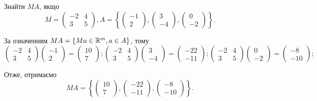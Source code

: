 \begin{problem}
	Знайти $MA$, якщо
	\[
	M=
  \begin{pmatrix}
    -2 & 4 \\
    3 & 5
  \end{pmatrix}
  , A= 
  \left\{
  \begin{pmatrix}
    -1 \\
    2 
  \end{pmatrix},
    \begin{pmatrix}
    3 \\
    -4 
  \end{pmatrix},
    \begin{pmatrix}
    0 \\
    -2 
  \end{pmatrix}
  \right\}
  .\]
\end{problem}

\begin{solution}
	За означенням $MA = \{Ma\in \mathbb{R}^m, a\in A\}$, тому
	\newline
   \[ \begin{pmatrix}
   -2 & 4 \\
   3 & 5
  \end{pmatrix}
  \begin{pmatrix}
    -1 \\
    2 
  \end{pmatrix}=
  \begin{pmatrix}
    10 \\
    7 
  \end{pmatrix};
   \begin{pmatrix}
   -2 & 4 \\
   3 & 5
  \end{pmatrix}
  \begin{pmatrix}
    3 \\
    -4 
  \end{pmatrix}=
  \begin{pmatrix}
    -22 \\
    -11 
  \end{pmatrix};
   \begin{pmatrix}
   -2 & 4 \\
   3 & 5
  \end{pmatrix}
  \begin{pmatrix}
    0 \\
    -2 
  \end{pmatrix}=
  \begin{pmatrix}
    -8 \\
    -10 
  \end{pmatrix};
  \]
  
  Отже, отримаємо \[MA = 
  \left\{
  \begin{pmatrix}
    10 \\
    7 
  \end{pmatrix},
  \begin{pmatrix}
    -22 \\
    -11 
  \end{pmatrix},
  \begin{pmatrix}
    -8 \\
    -10 
  \end{pmatrix}
  \right\}.\]
\end{solution}

